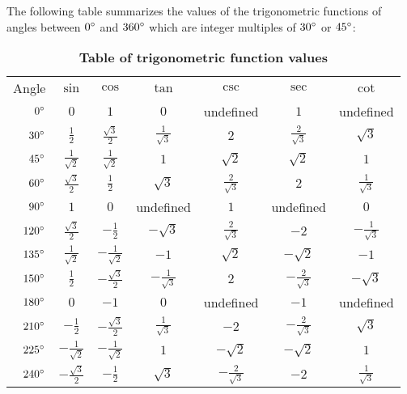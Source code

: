\divider
\newpage
{}
The following table summarizes the values of the trigonometric functions of angles between
$0^\circ$ and $360^\circ$ which are integer multiples of $30^\circ$ or
$45^\circ$:\vspace{-1mm}

\begin{table}[h]\centering
\caption{\quad \textbf{Table of trigonometric function values}}\vspace{3mm}
\renewcommand\arraystretch{1.3}
\begin{tabular}{rcccccc}
\rowcolor[HTML]{D5D5F2}
Angle & \phantom{mm}$\sin$\phantom{mm} & \phantom{m}$\cos$\phantom{mm} & $\tan$ & $\csc$ &
 $\sec$ & $\cot$\\
$0^\circ$ & $0$ & $1$ & $0$ & undefined & $1$ & undefined\\[4pt]
\rowcolor[HTML]{E6E6F2}
$30^\circ$ & $\frac{1}{2}$ & $\frac{\sqrt{3}}{2}$ & $\frac{1}{\sqrt{3}}$ &
 $2$ & $\frac{2}{\sqrt{3}}$ & $\sqrt{3}$\\[4pt]
$45^\circ$ & $\frac{1}{\sqrt{2}}$ & $\frac{1}{\sqrt{2}}$ & $1$ &
 $\sqrt{2}$ & $\sqrt{2}$ & $1$\\[4pt]
\rowcolor[HTML]{E6E6F2}
$60^\circ$ & $\frac{\sqrt{3}}{2}$ & $\frac{1}{2}$ & $\sqrt{3}$ &
 $\frac{2}{\sqrt{3}}$ & $2$ & $\frac{1}{\sqrt{3}}$\\[4pt]
$90^\circ$ & $1$ & $0$ & undefined & $1$ & undefined & $0$\\[4pt]
\rowcolor[HTML]{E6E6F2}
$120^\circ$ & $\frac{\sqrt{3}}{2}$ & $-\frac{1}{2}$ & $-\sqrt{3}$ &
 $\frac{2}{\sqrt{3}}$ & $-2$ & $-\frac{1}{\sqrt{3}}$\\[4pt]
$135^\circ$ & $\frac{1}{\sqrt{2}}$ & $-\frac{1}{\sqrt{2}}$ & $-1$ &
 $\sqrt{2}$ & $-\sqrt{2}$ & $-1$\\[4pt]
\rowcolor[HTML]{E6E6F2}
$150^\circ$ & $\frac{1}{2}$ & $-\frac{\sqrt{3}}{2}$ & $-\frac{1}{\sqrt{3}}$ &
 $2$ & $-\frac{2}{\sqrt{3}}$ & $-\sqrt{3}$\\[4pt]
$180^\circ$ & $0$ & $-1$ & $0$ & undefined & $-1$ & undefined\\[4pt]
\rowcolor[HTML]{E6E6F2}
$210^\circ$ & $-\frac{1}{2}$ & $-\frac{\sqrt{3}}{2}$ & $\frac{1}{\sqrt{3}}$ &
 $-2$ & $-\frac{2}{\sqrt{3}}$ & $\sqrt{3}$\\[4pt]
$225^\circ$ & $-\frac{1}{\sqrt{2}}$ & $-\frac{1}{\sqrt{2}}$ & $1$ &
 $-\sqrt{2}$ & $-\sqrt{2}$ & $1$\\[4pt]
\rowcolor[HTML]{E6E6F2}
$240^\circ$ & $-\frac{\sqrt{3}}{2}$ & $-\frac{1}{2}$ & $\sqrt{3}$ &
 $-\frac{2}{\sqrt{3}}$ & $-2$ & $\frac{1}{\sqrt{3}}$\\[4pt]

\end{tabular}
\end{table}
